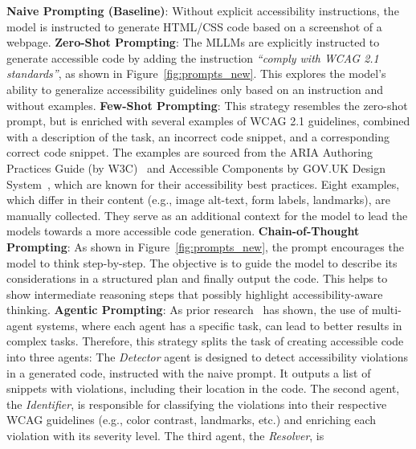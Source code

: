 \noindent
\textbf{Naive Prompting (Baseline)}: 
  Without explicit accessibility instructions, the model is
  instructed to generate HTML/CSS code based on a screenshot of a webpage.\newline
\noindent
\textbf{Zero-Shot Prompting}: 
  The MLLMs are explicitly instructed to 
  generate accessible code by adding the instruction \textit{``comply with WCAG 2.1 standards''}, 
  as shown in Figure~\ref{fig:prompts_new}. 
  This explores the model's ability to generalize accessibility guidelines 
  only based on an instruction and without examples.\newline
\noindent
\textbf{Few-Shot Prompting}: 
  This strategy resembles the zero-shot prompt,
  but is enriched with several examples of WCAG 2.1 guidelines, combined 
  with a description of the task, an incorrect code snippet, and a 
  corresponding correct code snippet.
  The examples are sourced from the ARIA Authoring Practices Guide 
  (by W3C)~\cite{web:w3c_examples} and Accessible Components by GOV.UK
  Design System~\cite{web:govuk}, which are known for their accessibility
  best practices.
  Eight examples, which differ in their content (e.g., image alt-text, 
  form labels, landmarks), are manually collected. They serve as an 
  additional context for the model to lead the models towards a more 
  accessible code generation.\newline
\noindent
\textbf{Chain-of-Thought Prompting}: 
  As shown in Figure~\ref{fig:prompts_new}, 
  the prompt encourages the model to think step-by-step. 
  The objective is to guide the model to describe its 
  considerations in a structured plan and finally output the code.
  This helps to show intermediate reasoning steps that possibly 
  highlight accessibility-aware thinking.\newline
\noindent
\textbf{Agentic Prompting}: 
  As prior research~\cite{wu2023autogen} has shown, the use of multi-agent 
  systems, where each agent has a specific task, can lead to better
  results in complex tasks. Therefore, this strategy splits the 
  task of creating accessible code into three agents: The 
  \textit{Detector} agent is designed to detect accessibility violations 
  in a generated code, instructed with the naive prompt. It outputs a list
  of snippets with violations, including their location in the code. The 
  second agent, the \textit{Identifier}, is responsible for classifying 
  the violations into their respective WCAG guidelines (e.g., 
  color contrast, landmarks, etc.) and enriching each violation with 
  its severity level. The third agent, the \textit{Resolver}, is 
